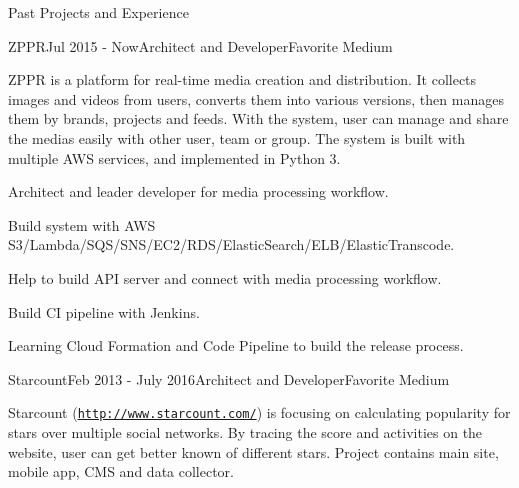 \documentclass{resume} %
\newcommand{\http}{http:/\hspace{-0.3ex}/}
\begin{document}
\begin{rSection}{Past Projects and Experience}


\begin{rSubsection}{ZPPR}{Jul 2015 - Now}{Architect and Developer}{Favorite Medium}

ZPPR is a platform for real-time media creation and distribution. It collects images and videos from users, converts them into various versions, then manages them by brands, projects and feeds. With the system, user can manage and share the medias easily with other user, team or group. The system is built with multiple AWS services, and implemented in Python 3.

\begin{rSubsectionList}
\item Architect and leader developer for media processing workflow.
\item Build system with AWS S3/Lambda/SQS/SNS/EC2/RDS/ElasticSearch/ELB/ElasticTranscode.
\item Help to build API server and connect with media processing workflow.
\item Build CI pipeline with Jenkins.
\item Learning Cloud Formation and Code Pipeline to build the release process.
\end{rSubsectionList}
\end{rSubsection}


\begin{rSubsection}{Starcount}{Feb 2013 - July 2016}{Architect and Developer}{Favorite Medium}

Starcount (\href{http://www.starcount.com/}{\tt \http{}www.starcount.com/}) is focusing on calculating popularity for stars over multiple social networks. By tracing the score and activities on the website, user can get better known of different stars. Project contains main site, mobile app, CMS and data collector.


\end{rSubsection}
\end{rSection}
\end{document}
